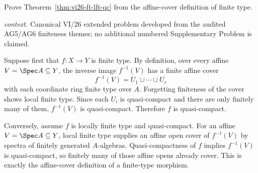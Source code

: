 \begin{problem}\label{prob:vi26-p04}
Prove Theorem~\ref{thm:vi26-ft-lft-qc} from the affine-cover definition of finite type.
\par\smallskip\noindent\textit{context.} Canonical VI/26 extended problem developed from the audited AG5/AG6 finiteness themes; no additional numbered Supplementary Problem is claimed.
\end{problem}

\ifdefined\FullProblemDossiers
\begin{solution}
Suppose first that \(f:X\to Y\) is finite type.  By definition, over every affine
\(V=\Spec A\subseteq Y\), the inverse image \(f^{-1}(V)\) has a finite affine cover
\[
f^{-1}(V)=U_1\cup\cdots\cup U_r
\]
with each coordinate ring finite type over \(A\).  Forgetting finiteness of the cover shows local
finite type.  Since each \(U_i\) is quasi-compact and there are only finitely many of them,
\(f^{-1}(V)\) is quasi-compact.  Therefore \(f\) is quasi-compact.

Conversely, assume \(f\) is locally finite type and quasi-compact.  For an affine
\(V=\Spec A\subseteq Y\), local finite type supplies an affine open cover of \(f^{-1}(V)\) by
spectra of finitely generated \(A\)-algebras.  Quasi-compactness of \(f\) implies
\(f^{-1}(V)\) is quasi-compact, so finitely many of those affine opens already cover.  This is
exactly the affine-cover definition of a finite-type morphism.
\end{solution}
\fi
